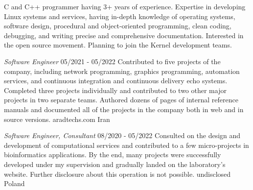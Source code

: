 \documentclass[a4paper,12pt]{memoir} %
\begin{document}
\userinformation %

\framebreak %


\CVDate




{C and C++ programmer having 3+ years of experience. Expertise in developing Linux systems and services, having in-depth knowledge of operating systems, software design, procedural and object-oriented programming, clean coding, debugging, and writing precise and comprehensive documentation. Interested in the open source movement. Planning to join the Kernel development teams.}


\SmallSep %




{\textit{Software Engineer}}
{05/2021 - 05/2022}
{Contributed to five projects of the company, including network programming, graphics programming, automation services, and continuous integration and continuous delivery echo systems.
Completed three projects individually and contributed to two other major projects in two separate teams.
Authored dozens of pages of internal reference manuals and documented all of the projects in the company both in web and in source versions.}
{aradtechs.com}
{Iran}


{\textit{Software Engineer, Consultant}}
{08/2020 - 05/2022}
{Consulted on the design and development of computational services and contributed to a few micro-projects in bioinformatics applications. By the end, many projects were successfully developed under my supervision and gradually landed on the laboratory’s website. Further disclosure about this operation is not possible.}
{undisclosed}
{Poland}
\end{document}
